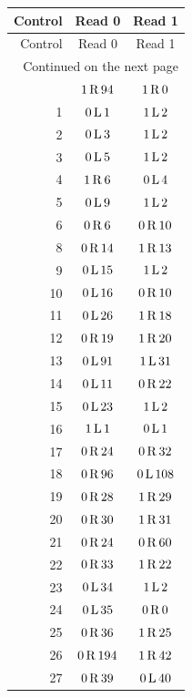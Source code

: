 \small\setlength{\tabcolsep}{14pt}
\begin{longtable}{@{}rcc@{}}
\toprule Control & Read 0 & Read 1\\\midrule\endfirsthead
\toprule Control & Read 0 & Read 1\\\midrule\endhead
\midrule\multicolumn{3}{r}{Continued on the next page}\\\endfoot
\bottomrule\endlastfoot
0 & $1\,\mathrm{R}\,94$ & $1\,\mathrm{R}\,0$\\
1 & $0\,\mathrm{L}\,1$ & $1\,\mathrm{L}\,2$\\
2 & $0\,\mathrm{L}\,3$ & $1\,\mathrm{L}\,2$\\
3 & $0\,\mathrm{L}\,5$ & $1\,\mathrm{L}\,2$\\
4 & $1\,\mathrm{R}\,6$ & $0\,\mathrm{L}\,4$\\
5 & $0\,\mathrm{L}\,9$ & $1\,\mathrm{L}\,2$\\
6 & $0\,\mathrm{R}\,6$ & $0\,\mathrm{R}\,10$\\
8 & $0\,\mathrm{R}\,14$ & $1\,\mathrm{R}\,13$\\
9 & $0\,\mathrm{L}\,15$ & $1\,\mathrm{L}\,2$\\
10 & $0\,\mathrm{L}\,16$ & $0\,\mathrm{R}\,10$\\
11 & $0\,\mathrm{L}\,26$ & $1\,\mathrm{R}\,18$\\
12 & $0\,\mathrm{R}\,19$ & $1\,\mathrm{R}\,20$\\
13 & $0\,\mathrm{L}\,91$ & $1\,\mathrm{L}\,31$\\
14 & $0\,\mathrm{L}\,11$ & $0\,\mathrm{R}\,22$\\
15 & $0\,\mathrm{L}\,23$ & $1\,\mathrm{L}\,2$\\
16 & $1\,\mathrm{L}\,1$ & $0\,\mathrm{L}\,1$\\
17 & $0\,\mathrm{R}\,24$ & $0\,\mathrm{R}\,32$\\
18 & $0\,\mathrm{R}\,96$ & $0\,\mathrm{L}\,108$\\
19 & $0\,\mathrm{R}\,28$ & $1\,\mathrm{R}\,29$\\
20 & $0\,\mathrm{R}\,30$ & $1\,\mathrm{R}\,31$\\
21 & $0\,\mathrm{R}\,24$ & $0\,\mathrm{R}\,60$\\
22 & $0\,\mathrm{R}\,33$ & $1\,\mathrm{R}\,22$\\
23 & $0\,\mathrm{L}\,34$ & $1\,\mathrm{L}\,2$\\
24 & $0\,\mathrm{L}\,35$ & $0\,\mathrm{R}\,0$\\
25 & $0\,\mathrm{R}\,36$ & $1\,\mathrm{R}\,25$\\
26 & $0\,\mathrm{R}\,194$ & $1\,\mathrm{R}\,42$\\
27 & $0\,\mathrm{R}\,39$ & $0\,\mathrm{L}\,40$\\

\end{longtable}
